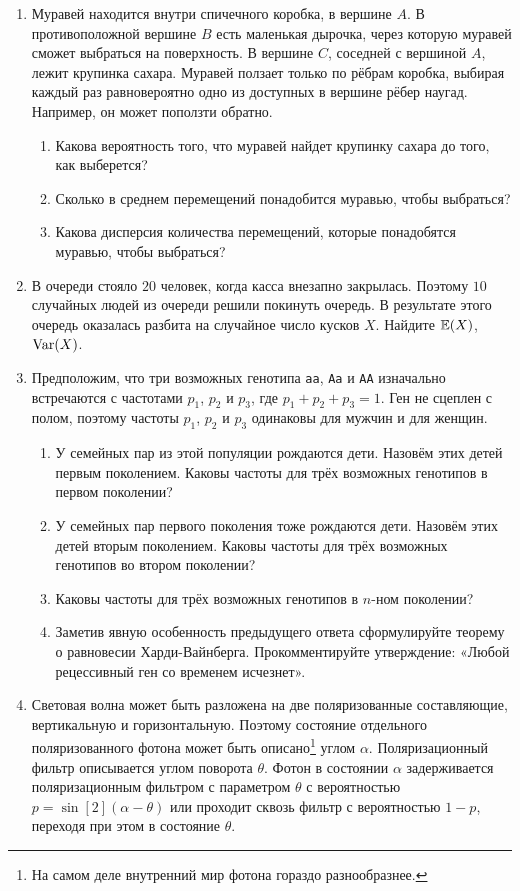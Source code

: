 \begin{enumerate}
\item Муравей находится внутри спичечного коробка, в вершине $A$. В противоположной
вершине $B$ есть маленькая дырочка, через которую муравей сможет выбраться на поверхность.
В вершине $C$, соседней с вершиной $A$, лежит крупинка сахара. Муравей ползает
только по рёбрам коробка, выбирая каждый раз равновероятно одно из доступных в
вершине рёбер наугад. Например, он может поползти обратно.
\begin{enumerate}
\item Какова вероятность того, что муравей найдет крупинку сахара до того, как выберется?
\item Сколько в среднем перемещений понадобится муравью, чтобы выбраться?
\item Какова дисперсия количества перемещений, которые понадобятся муравью, чтобы
выбраться?
\end{enumerate}

\item В очереди стояло $20$ человек, когда касса внезапно закрылась. Поэтому $10$
случайных людей из очереди решили покинуть очередь. В результате этого очередь
оказалась разбита на случайное число кусков $X$. Найдите $\operatorname{\mathbb{E}}(X)$, $\operatorname{Var}(X)$.

\item Предположим, что три возможных генотипа \verb|aa|, \verb|Aa| и \verb|AA|
изначально встречаются с частотами $p_1$, $p_2$ и $p_3$, где $p_1 + p_2 + p_3 = 1$.
Ген не сцеплен с полом, поэтому частоты $p_1$, $p_2$ и $p_3$ одинаковы для мужчин
и для женщин.
\begin{enumerate}
\item У семейных пар из этой популяции рождаются дети. Назовём этих детей первым
поколением. Каковы частоты для трёх возможных генотипов в первом поколении?
\item У семейных пар первого поколения тоже рождаются дети. Назовём этих детей
вторым поколением. Каковы частоты для трёх возможных генотипов во втором поколении?
\item Каковы частоты для трёх возможных генотипов в $n$-ном поколении?
\item Заметив явную особенность предыдущего ответа сформулируйте теорему о равновесии
Харди-Вайнберга. Прокомментируйте утверждение: «Любой рецессивный ген со временем
исчезнет».
\end{enumerate}

\item Световая волна может быть разложена на две поляризованные составляющие,
вертикальную и горизонтальную. Поэтому состояние отдельного поляризованного фотона
может быть описано\footnote{На самом деле внутренний мир фотона гораздо разнообразнее.}
углом $\alpha$. Поляризационный фильтр описывается углом поворота $\theta$. Фотон
в состоянии $\alpha$ задерживается поляризационным фильтром с параметром $\theta$
с вероятностью $p=\sin[2](\alpha-\theta)$ или проходит сквозь фильтр с вероятностью
$1 - p$, переходя при этом в состояние $\theta$.


\end{enumerate}
